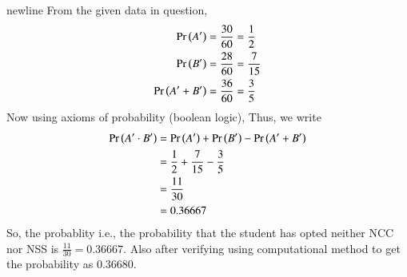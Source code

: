 \documentclass[journal]{IEEEtran}
\begin{document}
   newline From the given data in question,
    \begin{align}
        \Pr\left(A^\prime\right) &= \frac{30}{60} = \frac{1}{2} \\
        \Pr\left(B^\prime\right) &= \frac{28}{60} = \frac{7}{15} \\
        \Pr\left(A^\prime + B^\prime\right) &= \frac{36}{60} = \frac{3}{5}    
    \end{align}
Now using axioms of probability (boolean logic),
Thus, we write
    \begin{align}
	    \Pr\left(A^\prime \cdot B^\prime\right) &= \Pr\left(A^\prime\right) +  \Pr\left(B^\prime\right) - \Pr\left(A^\prime + B^\prime\right) \\
	                                 &= \frac{1}{2} + \frac{7}{15} - \frac{3}{5} \\
	                                 &= \frac{11}{30} \\
	                                 &= 0.36667
    \end{align}
\newline So, the probablity  i.e., the probability that the student has opted neither NCC nor NSS is $\frac{11}{30} = 0.36667$.
Also after verifying using computational method to get the probability as 0.36680.
\end{document}
